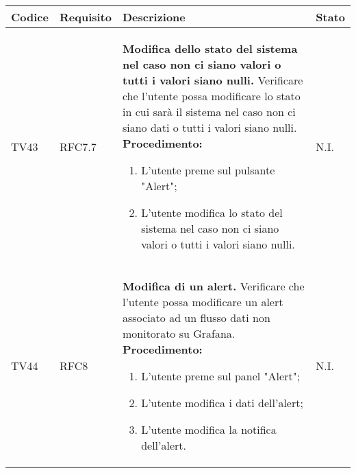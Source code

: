 \begin{table}[!htpb]
	\centering
	\renewcommand{\arraystretch}{2} 
	\begin{tabular}{|l|l|p{10cm}|l|}
		\rowcolor{orange!50}
		\hline
		\textbf{Codice} & \textbf{Requisito}& \textbf{Descrizione} & \textbf{Stato}\\ 
		\hline
		TV43 & RFC7.7 &
			\textbf{Modifica dello stato del sistema nel caso non ci siano valori o tutti i valori siano nulli.}
			\newline
			Verificare che l'utente possa modificare lo stato in cui sarà il sistema nel caso non ci siano dati o tutti i valori siano nulli.
			\newline
			\textbf{Procedimento:}
			\begin{enumerate}
				\item L’utente preme sul pulsante "Alert";
				\item L’utente modifica lo stato del sistema nel caso non ci siano valori o tutti i valori siano nulli.
			\end{enumerate} 
			& N.I.\\
		\hline
		TV44 & RFC8 &
			\textbf{Modifica di un alert.} 
			\newline
			Verificare che l’utente possa modificare un alert associato ad un flusso dati non monitorato su Grafana. 
			\newline 
			\textbf{Procedimento:} 
			\begin{enumerate} 
				\item L'utente preme sul panel "Alert"; 
				\item L'utente modifica i dati dell'alert; 
				\item L'utente modifica la notifica dell'alert.		
			\end{enumerate} 
			& N.I.\\
		\hline
	\end{tabular}
\end{table}
